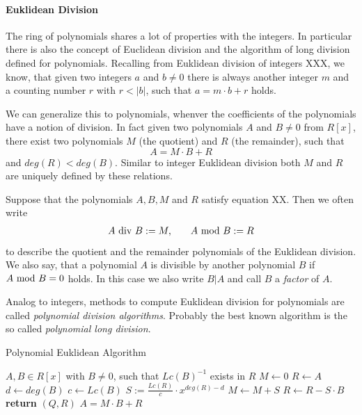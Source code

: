 \paragraph{Euklidean Division}
The ring of polynomials shares a lot of properties with the integers. In particular there is also the concept of Euclidean division and the algorithm of long division defined for polynomials. Recalling from Euklidean division of integers XXX, we know, that given two integers $a$ and $b\neq 0$ there is always another integer $m$ and a counting number $r$ with $r<|b|$, such that $a = m\cdot b +r$ holds.

We can generalize this to polynomials, whenver the coefficients of the polynomials have a notion of division. In fact given two polynomials $A$ and $B\neq 0$ from $R[x]$, there exist two polynomials $M$ (the quotient) and $R$ (the remainder), such that
\begin{equation}
A = M\cdot B + R
\end{equation}
and $deg(R) < deg(B)$. Similar to integer Euklidean division both $M$ and $R$ are uniquely defined by these relations. 
\begin{notation}
\label{eq_polynomial_euklidean_division_notation}
Suppose that the polynomials $ A, B, M $ and $ R $ satisfy equation XX. Then we often write 
\begin{equation}
\label{def_integer_division_and_modulus}
\begin{array}{lcr}
A \text{ div } B: = M, & & A \text{ mod } B: = R 
\end{array}
\end{equation}
to describe the quotient and the remainder polynomials of the Euklidean division. We also say, that a polynomial $ A $ is divisible by another polynomial $ B $ if $ A \text{ mod } B = 0 $ holds. In this case we also write $ B | A $ and call $B$ a \textit{factor} of $A$.
\end{notation}
Analog to integers, methods to compute Euklidean division for polynomials are called \textit{polynomial division algorithms}. Probably the best known algorithm is the so called \textit{polynomial long division}. 
\begin{algorithm}\caption{Polynomial Euklidean Algorithm}
\label{alg_ext_euclid_alg}
\begin{algorithmic}[0]
\Require $A,B \in R[x]$ with $B\neq 0$, such that $Lc(B)^{-1}$ exists in $R$
\State $M \gets 0$
\State $R \gets A$
\State $d \gets deg(B)$
\State $c \gets Lc(B)$
\State  $S := \frac{Lc(R)}{c}\cdot x^{deg(R)-d}$
\State $M \gets M + S$
\State $R \gets R - S\cdot B$
\EndWhile
\State \textbf{return} $(Q, R)$ 
\EndProcedure
\Ensure $ A=  M \cdot B + R$
\end{algorithmic}
\end{algorithm}

